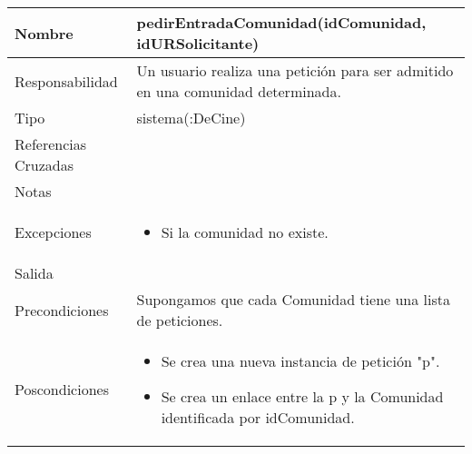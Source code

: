 \documentclass{article}
\begin{document}
\begin{table}[h]
\begin{tabular}{|l|l|l|l|l|l|}
\hline
\multicolumn{2}{|p{3cm}|}{Nombre} & \multicolumn{4}{p{10cm}|}{\textbf{pedirEntradaComunidad(idComunidad, idURSolicitante)}}\\
\hline
\multicolumn{2}{|p{3cm}|}{Responsabilidad} & \multicolumn{4}{p{10cm}|}{Un usuario realiza una petición para ser admitido en una comunidad determinada.} \\
\hline
\multicolumn{2}{|p{3cm}|}{Tipo} & \multicolumn{4}{p{10cm}|}{sistema(:DeCine)} \\
\hline
\multicolumn{2}{|p{3cm}|}{Referencias Cruzadas} & \multicolumn{4}{p{10cm}|}{} \\
\hline
\multicolumn{2}{|p{3cm}|}{Notas} & \multicolumn{4}{p{10cm}|}{} \\
\hline
\multicolumn{2}{|p{3cm}|}{Excepciones} & \multicolumn{4}{p{10cm}|}{\begin{itemize}
\item Si la comunidad no existe.
\end{itemize}} \\
\hline
\multicolumn{2}{|p{3cm}|}{Salida} & \multicolumn{4}{p{10cm}|}{} \\
\hline
\multicolumn{2}{|p{3cm}|}{Precondiciones} & \multicolumn{4}{p{10cm}|}{Supongamos que cada Comunidad tiene una lista de peticiones.} \\
\hline
\multicolumn{2}{|p{3cm}|}{Poscondiciones} & \multicolumn{4}{p{10cm}|}{\begin{itemize}
\item Se crea una nueva instancia de petición "p".
\item Se crea un enlace entre la p y la Comunidad identificada por idComunidad.
\end{itemize}} \\
\hline
\end{tabular}
\end{table}
\end{document}
